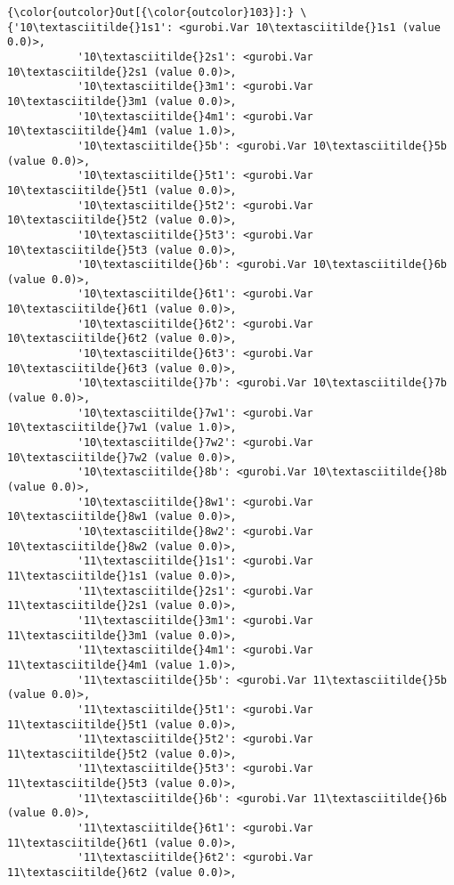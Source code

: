 \documentclass[11pt]{article}
\begin{document}
            \begin{Verbatim}[commandchars=\\\{\}]
{\color{outcolor}Out[{\color{outcolor}103}]:} \{'10\textasciitilde{}1s1': <gurobi.Var 10\textasciitilde{}1s1 (value 0.0)>,
           '10\textasciitilde{}2s1': <gurobi.Var 10\textasciitilde{}2s1 (value 0.0)>,
           '10\textasciitilde{}3m1': <gurobi.Var 10\textasciitilde{}3m1 (value 0.0)>,
           '10\textasciitilde{}4m1': <gurobi.Var 10\textasciitilde{}4m1 (value 1.0)>,
           '10\textasciitilde{}5b': <gurobi.Var 10\textasciitilde{}5b (value 0.0)>,
           '10\textasciitilde{}5t1': <gurobi.Var 10\textasciitilde{}5t1 (value 0.0)>,
           '10\textasciitilde{}5t2': <gurobi.Var 10\textasciitilde{}5t2 (value 0.0)>,
           '10\textasciitilde{}5t3': <gurobi.Var 10\textasciitilde{}5t3 (value 0.0)>,
           '10\textasciitilde{}6b': <gurobi.Var 10\textasciitilde{}6b (value 0.0)>,
           '10\textasciitilde{}6t1': <gurobi.Var 10\textasciitilde{}6t1 (value 0.0)>,
           '10\textasciitilde{}6t2': <gurobi.Var 10\textasciitilde{}6t2 (value 0.0)>,
           '10\textasciitilde{}6t3': <gurobi.Var 10\textasciitilde{}6t3 (value 0.0)>,
           '10\textasciitilde{}7b': <gurobi.Var 10\textasciitilde{}7b (value 0.0)>,
           '10\textasciitilde{}7w1': <gurobi.Var 10\textasciitilde{}7w1 (value 1.0)>,
           '10\textasciitilde{}7w2': <gurobi.Var 10\textasciitilde{}7w2 (value 0.0)>,
           '10\textasciitilde{}8b': <gurobi.Var 10\textasciitilde{}8b (value 0.0)>,
           '10\textasciitilde{}8w1': <gurobi.Var 10\textasciitilde{}8w1 (value 0.0)>,
           '10\textasciitilde{}8w2': <gurobi.Var 10\textasciitilde{}8w2 (value 0.0)>,
           '11\textasciitilde{}1s1': <gurobi.Var 11\textasciitilde{}1s1 (value 0.0)>,
           '11\textasciitilde{}2s1': <gurobi.Var 11\textasciitilde{}2s1 (value 0.0)>,
           '11\textasciitilde{}3m1': <gurobi.Var 11\textasciitilde{}3m1 (value 0.0)>,
           '11\textasciitilde{}4m1': <gurobi.Var 11\textasciitilde{}4m1 (value 1.0)>,
           '11\textasciitilde{}5b': <gurobi.Var 11\textasciitilde{}5b (value 0.0)>,
           '11\textasciitilde{}5t1': <gurobi.Var 11\textasciitilde{}5t1 (value 0.0)>,
           '11\textasciitilde{}5t2': <gurobi.Var 11\textasciitilde{}5t2 (value 0.0)>,
           '11\textasciitilde{}5t3': <gurobi.Var 11\textasciitilde{}5t3 (value 0.0)>,
           '11\textasciitilde{}6b': <gurobi.Var 11\textasciitilde{}6b (value 0.0)>,
           '11\textasciitilde{}6t1': <gurobi.Var 11\textasciitilde{}6t1 (value 0.0)>,
           '11\textasciitilde{}6t2': <gurobi.Var 11\textasciitilde{}6t2 (value 0.0)>,

\end{Verbatim}
\end{document}

